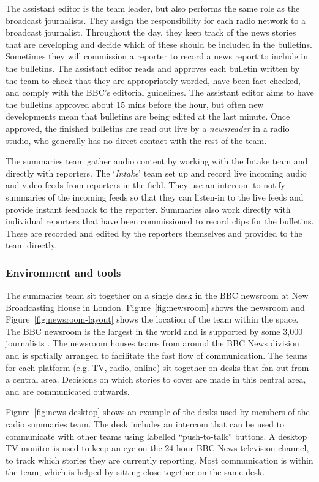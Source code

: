 The assistant editor is the team leader, but also performs the same role as the broadcast journalists. They assign the
responsibility for each radio network to a broadcast journalist. Throughout the day, they keep track of the news
stories that are developing and decide which of these should be included in the bulletins. Sometimes they will
commission a reporter to record a news report to include in the bulletins. The assistant editor reads and approves each
bulletin written by the team to check that they are appropriately worded, have been fact-checked, and comply with the
BBC's editorial guidelines.  The assistant editor aims to have the bulletins approved about 15 mins before the hour,
but often new developments mean that bulletins are being edited at the last minute.  Once approved, the finished
bulletins are read out live by a \textit{newsreader} in a radio studio, who generally has no direct contact with the
rest of the team.

The summaries team gather audio content by working with the Intake team and directly with reporters. The
`\textit{Intake}' team set up and record live incoming audio and video feeds from reporters in the field. They use an
intercom to notify summaries of the incoming feeds so that they can listen-in to the live feeds and provide instant
feedback to the reporter.  Summaries also work directly with individual reporters that have been commissioned to record
clips for the bulletins. These are recorded and edited by the reporters themselves and provided to the team directly.

\subsubsection{Environment and tools}
The summaries team sit together on a single desk in the BBC newsroom at New Broadcasting House in London.
Figure~\ref{fig:newsroom} shows the newsroom and Figure~\ref{fig:newsroom-layout} shows the location of the team within
the space. The BBC newsroom is the largest in the world and is supported by some 3,000 journalists
\citep[p.~80]{McLeish2015}.  The newsroom houses teams from around the BBC News division and is spatially arranged to
facilitate the fast flow of communication. The teams for each platform (e.g. TV, radio, online) sit together on desks
that fan out from a central area. Decisions on which stories to cover are made in this central area, and are
communicated outwards.

Figure~\ref{fig:news-desktop} shows an example of the desks used by members of the radio summaries team. The desk
includes an intercom that can be used to communicate with other teams using labelled ``push-to-talk'' buttons. A
desktop TV monitor is used to keep an eye on the 24-hour BBC News television channel, to track which stories they are
currently reporting. Most communication is within the team, which is helped by sitting close together on the same desk.

